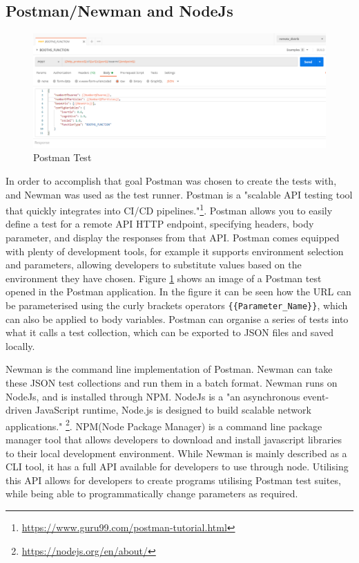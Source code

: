 \documentclass[oneside,12pt]{book}
\begin{document}
\subsection{Postman/Newman and NodeJs}
\begin{figure}[H]
    \centering
    \includegraphics[scale=0.5]{Images/PostmanTest.png}
    \caption{Postman Test}
    \label{fig:PostmanTest}
\end{figure}
In order to accomplish that goal Postman was chosen to create the tests with, and Newman was used as the test runner. Postman is a "scalable API testing tool that quickly integrates into CI/CD pipelines."\footnote{\url{https://www.guru99.com/postman-tutorial.html}}. Postman allows you to easily define a test for a remote API HTTP endpoint, specifying headers, body parameter, and display the responses from that API. Postman comes equipped with plenty of development tools, for example it supports environment selection and parameters, allowing developers to substitute values based on the environment they have chosen. Figure \ref{fig:PostmanTest} shows an image of a Postman test opened in the Postman application. In the figure it can be seen how the URL can be parameterised using the curly brackets operators \verb|{{Parameter_Name}}|, which can also be applied to body variables.  Postman can organise a series of tests into what it calls a test collection, which can be exported to JSON files and saved locally. 


Newman is the command line implementation of Postman. Newman can take these JSON test collections and run them in a batch format. Newman runs on NodeJs, and is installed through NPM. NodeJs is a "an asynchronous event-driven JavaScript runtime, Node.js is designed to build scalable network applications." \footnote{\url{https://nodejs.org/en/about/}}. NPM(Node Package Manager) is a command line package manager tool that allows developers to download and install javascript libraries to their local development environment. While Newman is mainly described as a CLI tool, it has a full API available for developers to use through node. Utilising this API allows for developers to create programs utilising Postman test suites, while being able to programmatically change parameters as required. 
\end{document}
